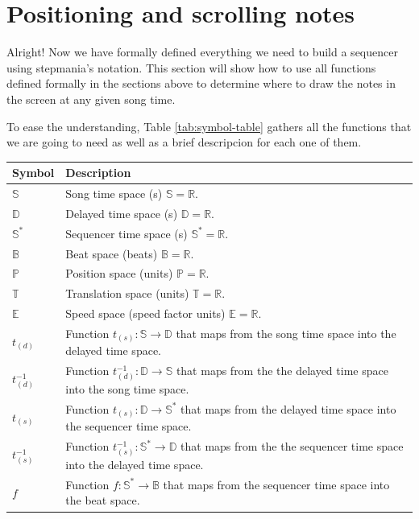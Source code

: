 \documentclass[a4paper,9pt]{article}
\begin{document}
\section{Positioning and scrolling notes}

Alright! Now we have formally defined everything we need to build a sequencer using stepmania's notation. This section will show how to use all functions defined formally in the sections above to determine where to draw the notes in the screen at any given song time. 

To ease the understanding, Table \ref{tab:symbol-table} gathers all the functions that we are going to need as well as a brief descripcion for each one of them.

    \begin{table}[htbp]
	    \centering
	    \begin{tabular}{lp{11cm}}
		    Symbol & Description \\\toprule
		    $ \mathbb{S} $ & Song time space (s) $ \mathbb{S} = \mathbb{R} $.\\
		    $ \mathbb{D} $ & Delayed time space (s) $ \mathbb{D} = \mathbb{R} $.\\
		    $ \mathbb{S^{*}} $ & Sequencer time space (s) $ \mathbb{S^{*}} = \mathbb{R} $.\\
		    $ \mathbb{B} $ & Beat space (beats) $ \mathbb{B} = \mathbb{R} $.\\
		    $ \mathbb{P} $ & Position space (units) $ \mathbb{P} = \mathbb{R} $.\\
		    $ \mathbb{T} $ & Translation space (units) $ \mathbb{T} = \mathbb{R} $.\\
		    $ \mathbb{E} $ & Speed space (speed factor units) $ \mathbb{E} = \mathbb{R} $.\\
		    $ t_{(d)} $ & Function  $ t_{(s)}: \mathbb{S}\rightarrow \mathbb{D} $ that maps from the song time space into the delayed time space.\\
	    $ t_{(d)}^{-1} $ & Function  $ t_{(d)}^{-1}: \mathbb{D}\rightarrow \mathbb{S} $ that maps from the the delayed time space into the song time space.\\
		    $ t_{(s)} $ & Function  $ t_{(s)}: \mathbb{D}\rightarrow \mathbb{S^{*}} $ that maps from the delayed time space into the sequencer time space.\\
	    $ t_{(s)}^{-1}$ & Function  $ t_{(s)}^{-1}: \mathbb{S^{*}}\rightarrow \mathbb{D} $ that maps from the the sequencer time space into the delayed time space.\\
		    $ f $ & Function $ f: \mathbb{S^{*}}\rightarrow \mathbb{B} $ that maps from the sequencer time space into the beat space. \\

\end{tabular}
\end{table}
\end{document}
